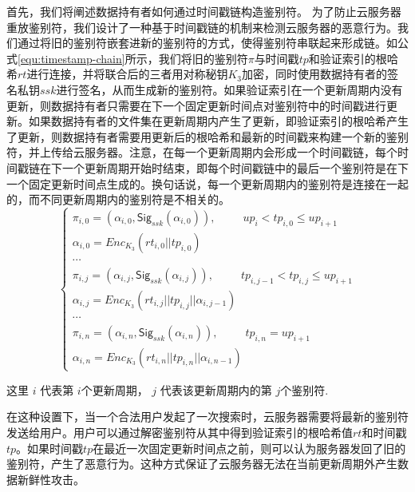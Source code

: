 首先，我们将阐述数据持有者如何通过时间戳链构造鉴别符。
为了防止云服务器重放鉴别符，我们设计了一种基于时间戳链的机制来检测云服务器的恶意行为。我们通过将旧的鉴别符嵌套进新的鉴别符的方式，使得鉴别符串联起来形成链。如公式\ref{equ:timestamp-chain}所示，我们将旧的鉴别符$\pi$与时间戳$tp$和验证索引的根哈希$rt$进行连接，并将联合后的三者用对称秘钥$K_3$加密，同时使用数据持有者的签名私钥$ssk$进行签名，从而生成新的鉴别符。如果验证索引在一个更新周期内没有更新，则数据持有者只需要在下一个固定更新时间点对鉴别符中的时间戳进行更新。如果数据持有者的文件集在更新周期内产生了更新，即验证索引的根哈希产生了更新，则数据持有者需要用更新后的根哈希和最新的时间戳来构建一个新的鉴别符，并上传给云服务器。注意，在每一个更新周期内会形成一个时间戳链，每个时间戳链在下一个更新周期开始时结束，即每个时间戳链中的最后一个鉴别符是在下一个固定更新时间点生成的。换句话说，每一个更新周期内的鉴别符是连接在一起的，而不同更新周期内的鉴别符是不相关的。
\vspace{-0.05in}
\begin{equation}
  \label{equ:timestamp-chain}
    \left\{
    \begin{array}{ll} %
      \pi_{i, 0} = (\alpha_{i, 0}, \mathsf{Sig}_{ssk}(\alpha_{i, 0})),~~~~~~~~~~~up_i < tp_{i, 0} \leq up_{i+1} \\
      \alpha_{i, 0} = Enc_{K_3}(rt_{i, 0}||tp_{i, 0}) \\
      \cdots \\

     \pi_{i, j} = (\alpha_{i, j}, \mathsf{Sig}_{ssk}(\alpha_{i, j})),~~~~~~~~~~~tp_{i, j-1} < tp_{i, j} \leq up_{i+1}  \\
     \alpha_{i, j} = Enc_{K_3}(rt_{i, j}||tp_{i, j}||\alpha_{i, j-1}) \\
      \cdots  \\
     \pi_{i, n} = (\alpha_{i, n}, \mathsf{Sig}_{ssk}(\alpha_{i, n})),~~~~~~~~~~~tp_{i, n}=up_{i+1} \\
     \alpha_{i, n} = Enc_{K_3}(rt_{i, n}||tp_{i, n}||\alpha_{i, n-1})
    \end{array}
    \right.
  \end{equation}

\noindent 这里 $i$ 代表第 $i$个更新周期， $j$ 代表该更新周期内的第 $j$个鉴别符.

在这种设置下，当一个合法用户发起了一次搜索时，云服务器需要将最新的鉴别符发送给用户。用户可以通过解密鉴别符从其中得到验证索引的根哈希值$rt$和时间戳$tp$。如果时间戳$tp$在最近一次固定更新时间点之前，则可以认为服务器发回了旧的鉴别符，产生了恶意行为。这种方式保证了云服务器无法在当前更新周期外产生数据新鲜性攻击。

